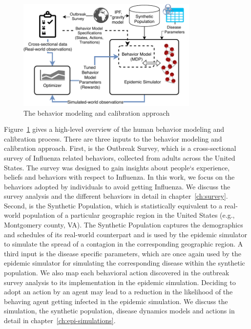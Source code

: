 \documentclass[doublespace]{VTthesis}
\begin{document}
    \begin{figure}
    \centering
    \includegraphics[width=0.8\textwidth]{figures/calibrationproc.pdf}
    \caption{The behavior modeling and calibration approach}
    \label{fig:calib-proc}
    \end{figure}
    
    Figure~\ref{fig:calib-proc} gives a high-level overview of the human behavior modeling and calibration process. There are three inputs to the behavior modeling and calibration approach. First, is the Outbreak Survey, which is a cross-sectional survey of Influenza related behaviors, collected from adults across the United States. The survey was designed to gain insights about people`s experience, beliefs and behaviors with respect to Influenza. In this work, we focus on the behaviors adopted by individuals to avoid getting Influenza. We discuss the survey analysis and the different behaviors in detail in chapter~\ref{ch:survey}. Second, is the Synthetic Population, which is statistically equivalent to a real-world population of a particular geographic region in the United States (e.g., Montgomery county, VA). The Synthetic Population captures the demographics and schedules of its real-world counterpart and is used by the epidemic simulator to simulate the spread of a contagion in the corresponding geographic region. A third input is the disease specific parameters, which are once again used by the epidemic simulator for simulating the corresponding disease within the synthetic population. We also map each behavioral action discovered in the outbreak survey analysis to its implementation in the epidemic simulation. Deciding to adopt an action by an agent may lead to a reduction in the likelihood of the behaving agent getting infected in the epidemic simulation. We discuss the simulation, the synthetic population, disease dynamics models and actions in detail in chapter~\ref{ch:epi-simulations}. 
    
\end{document}
